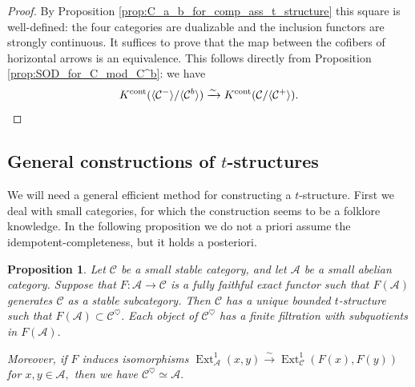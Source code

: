 \documentclass[11pt,leqno]{amsart}
\newtheorem{prop}[theo]{Proposition}
\numberwithin{equation}{section}
\newcommand{\xto}{\xrightarrow}
\newcommand{\cont}{\operatorname{cont}}
\newcommand{\cA}{{\mathcal A}}
\newcommand{\cC}{{\mathcal C}}
\newcommand{\la}{\langle}
\newcommand{\ra}{\rangle}
\newcommand{\Ext}{\operatorname{Ext}}
\begin{document}
\begin{proof}
By Proposition \ref{prop:C_a_b_for_comp_ass_t_structure} this square is well-defined: the four categories are dualizable and the inclusion functors are strongly continuous. It suffices to prove that the map between the cofibers of horizontal arrows is an equivalence. This follows directly from Proposition \ref{prop:SOD_for_C_mod_C^b}: we have
\begin{equation*}
K^{\cont}(\la\cC^-\ra/\la\cC^b\ra)\xto{\sim} K^{\cont}(\cC/\la\cC^+\ra).\qedhere
\end{equation*}
\end{proof}

\subsection{General constructions of $t$-structures}
\label{ssec:construction_of_t_structures}

We will need a general efficient method for constructing a $t$-structure. First we deal with small categories, for which the construction seems to be a folklore knowledge. In the following proposition we do not a priori assume the idempotent-completeness, but it holds a posteriori.

\begin{prop}\label{prop:t_structure_on_small_via_functor_from_abelian}
Let $\cC$ be a small stable category, and let $\cA$ be a small abelian category. Suppose that $F:\cA\to\cC$ is a fully faithful exact functor such that $F(\cA)$ generates $\cC$ as a stable subcategory. Then $\cC$ has a unique bounded $t$-structure such that $F(\cA)\subset \cC^{\heartsuit}.$ Each object of $\cC^{\heartsuit}$ has a finite filtration with subquotients in $F(\cA).$

Moreover, if $F$ induces isomorphisms $\Ext^1_{\cA}(x,y)\xto{\sim}\Ext^1_{\cC}(F(x),F(y))$ for $x,y\in\cA,$ then we have $\cC^{\heartsuit}\simeq\cA.$
\end{prop}
\end{document}
